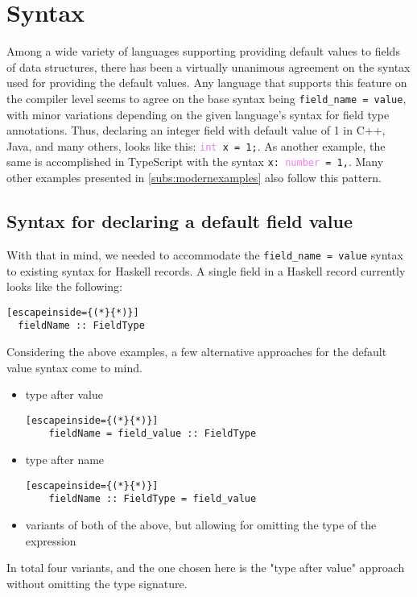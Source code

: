 \documentclass[en]{pracamgr}
\begin{document}
\chapter{Syntax}
Among a wide variety of languages supporting providing default values to fields of data structures, there has been a virtually unanimous agreement on the syntax used for providing the default values.
Any language that supports this feature on the compiler level seems to agree on the base syntax being \texttt{field\_name = value}, with minor variations depending on the given language's syntax for field type annotations.
Thus, declaring an integer field with default value of 1 in C++, Java, and many others, looks like this: \texttt{\textcolor{Violet}{int} x = \textcolor{BrickRed}{1};}.
As another example, the same is accomplished in TypeScript with the syntax \texttt{x:\ \textcolor{Violet}{number} = \textcolor{BrickRed}{1},}. 
Many other examples presented in \ref{subs:modernexamples} also follow this pattern.

\section{Syntax for declaring a default field value}
With that in mind, we needed to accommodate the \texttt{field\_name = value} syntax to existing syntax for Haskell records.
A single field in a Haskell record currently looks like the following:
\begin{lstlisting}[escapeinside={(*}{*)}]
  fieldName :: FieldType
\end{lstlisting}
Considering the above examples, a few alternative approaches for the default value syntax come to mind.

\begin{itemize}
  \item type after value
  \begin{lstlisting}[escapeinside={(*}{*)}]
    fieldName = field_value :: FieldType
  \end{lstlisting}
  \item type after name
  \begin{lstlisting}[escapeinside={(*}{*)}]
    fieldName :: FieldType = field_value
  \end{lstlisting}
  \item variants of both of the above, but allowing for omitting the type of the expression
\end{itemize}

In total four variants, and the one chosen here is the "type after value" approach without omitting the type signature.
\end{document}
